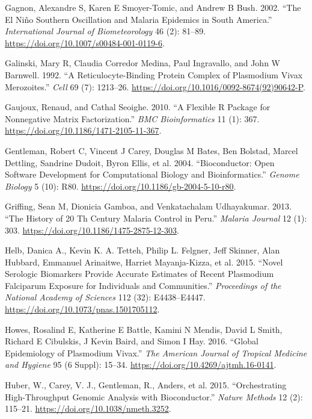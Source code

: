 \documentclass[
  a4paper]{article}
\begin{document}
\leavevmode\hypertarget{ref-gagnon2002enso}{}%
Gagnon, Alexandre S, Karen E Smoyer-Tomic, and Andrew B Bush. 2002.
``The El Niño Southern Oscillation and Malaria Epidemics in South
America.'' \emph{International Journal of Biometeorology} 46 (2):
81--89. \url{https://doi.org/10.1007/s00484-001-0119-6}.

\leavevmode\hypertarget{ref-galinski1992rbp}{}%
Galinski, Mary R, Claudia Corredor Medina, Paul Ingravallo, and John W
Barnwell. 1992. ``A Reticulocyte-Binding Protein Complex of Plasmodium
Vivax Merozoites.'' \emph{Cell} 69 (7): 1213--26.
\url{https://doi.org/10.1016/0092-8674(92)90642-P}.

\leavevmode\hypertarget{ref-Gaujoux2010NMF}{}%
Gaujoux, Renaud, and Cathal Seoighe. 2010. ``A Flexible R Package for
Nonnegative Matrix Factorization.'' \emph{BMC Bioinformatics} 11 (1):
367. \url{https://doi.org/10.1186/1471-2105-11-367}.

\leavevmode\hypertarget{ref-bioconductor2004}{}%
Gentleman, Robert C, Vincent J Carey, Douglas M Bates, Ben Bolstad,
Marcel Dettling, Sandrine Dudoit, Byron Ellis, et al. 2004.
``Bioconductor: Open Software Development for Computational Biology and
Bioinformatics.'' \emph{Genome Biology} 5 (10): R80.
\url{https://doi.org/10.1186/gb-2004-5-10-r80}.

\leavevmode\hypertarget{ref-griffing2013history}{}%
Griffing, Sean M, Dionicia Gamboa, and Venkatachalam Udhayakumar. 2013.
``The History of 20 Th Century Malaria Control in Peru.'' \emph{Malaria
Journal} 12 (1): 303. \url{https://doi.org/10.1186/1475-2875-12-303}.

\leavevmode\hypertarget{ref-Helb2015exposure}{}%
Helb, Danica A., Kevin K. A. Tetteh, Philip L. Felgner, Jeff Skinner,
Alan Hubbard, Emmanuel Arinaitwe, Harriet Mayanja-Kizza, et al. 2015.
``Novel Serologic Biomarkers Provide Accurate Estimates of Recent
Plasmodium Falciparum Exposure for Individuals and Communities.''
\emph{Proceedings of the National Academy of Sciences} 112 (32):
E4438--E4447. \url{https://doi.org/10.1073/pnas.1501705112}.

\leavevmode\hypertarget{ref-howes2016global}{}%
Howes, Rosalind E, Katherine E Battle, Kamini N Mendis, David L Smith,
Richard E Cibulskis, J Kevin Baird, and Simon I Hay. 2016. ``Global
Epidemiology of Plasmodium Vivax.'' \emph{The American Journal of
Tropical Medicine and Hygiene} 95 (6 Suppl): 15--34.
\url{https://doi.org/10.4269/ajtmh.16-0141}.

\leavevmode\hypertarget{ref-Biobase}{}%
Huber, W., Carey, V. J., Gentleman, R., Anders, et al. 2015.
``Orchestrating High-Throughput Genomic Analysis with Bioconductor.''
\emph{Nature Methods} 12 (2): 115--21.
\url{https://doi.org/10.1038/nmeth.3252}.
\end{document}
